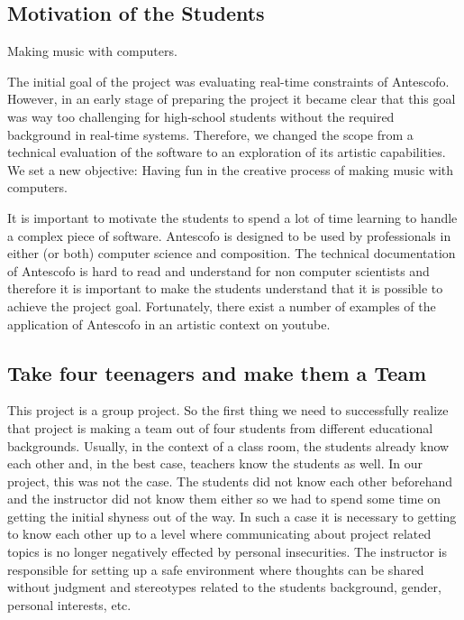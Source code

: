 \documentclass[onecolumn,nocopyrightspace,preprint]{sigplanconf}
\begin{document}
\subsection{Motivation of the Students}

Making music with computers.

The initial goal of the project was evaluating real-time constraints of
Antescofo. However, in an early stage of preparing the project it became clear
that this goal was way too challenging for high-school students without the
required background in real-time systems. Therefore, we changed the scope from
a technical evaluation of the software to an exploration of its artistic
capabilities. We set a new objective: Having fun in the creative process of
making music with computers.


It is important to motivate the students to spend a lot of time learning to
handle a complex piece of software. Antescofo is designed to be used by
professionals in either (or both) computer science and composition. The
technical documentation of Antescofo is hard to read and understand for non
computer scientists and therefore it is important to make the students
understand that it is possible to achieve the project goal. Fortunately, there
exist a number of examples of the application of Antescofo in an artistic
context on youtube.

\subsection{Take four teenagers and make them a Team}

This project is a group project. So the first thing we need to successfully
realize that project is making a team out of four students from different
educational backgrounds. Usually, in the context of a class room, the students
already know each other and, in the best case, teachers know the students as
well. In our project, this was not the case. The students did not know each
other beforehand and the instructor did not know them either so we had to
spend some time on getting the initial shyness out of the way.
In such a case it is necessary to getting to know each other up to a level
where communicating about project related topics is no longer negatively
effected by personal insecurities. The instructor is responsible for setting
up a safe environment where thoughts can be shared without judgment and
stereotypes related to the students background, gender, personal interests, etc.
\end{document}
